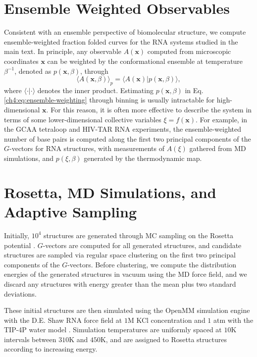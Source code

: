 \section{Ensemble Weighted Observables}
\label{ch4:app:ensemble-weighted-observables}

Consistent with an ensemble perspective of biomolecular structure, we compute ensemble-weighted fraction folded curves for the RNA systems studied in the main text. In principle, any observable $A(\mathbf{x})$ computed from microscopic coordinates $\mathbf{x}$ can be weighted by the conformational ensemble at temperature $\beta^{-1}$, denoted as $p(\mathbf{x},\beta)$, through
\begin{equation}
    \label{ch4:eq:ensemble-weighting}
    \langle A(\mathbf{x},\beta)\rangle_p = \langle A(\mathbf{x})|p(\mathbf{x},\beta) \rangle,
\end{equation}
where $\langle \cdot | \cdot \rangle$ denotes the inner product. Estimating $p(\mathbf{x},\beta)$ in Eq. \ref{ch4:eq:ensemble-weighting} through binning is usually intractable for high-dimensional $\mathbf{x}$. For this reason, it is often more effective to describe the system in terms of some lower-dimensional collective variables $\xi = f(\mathbf{x})$. For example, in the GCAA tetraloop and HIV-TAR RNA experiments, the ensemble-weighted number of base pairs is computed along the first two principal components of the $G$-vectors for RNA structures, with measurements of $A(\xi)$ gathered from MD simulations, and $p(\xi,\beta)$ generated by the thermodynamic map.

\section{Rosetta, MD Simulations, and Adaptive Sampling}
\label{ch4:app:rosetta-md-adaptive}

Initially, $10^4$ structures are generated through MC sampling on the Rosetta potential \cite{rosetta}. $G$-vectors are computed for all generated structures, and candidate structures are sampled via regular space clustering on the first two principal components of the $G$-vectors. Before clustering, we compute the distribution energies of the generated structures in vacuum using the MD force field, and we discard any structures with energy greater than the mean plus two standard deviations.

These initial structures are then simulated using the OpenMM simulation engine \cite{openmm} with the D.E. Shaw RNA force field \cite{DE-Shaw-RNA-ff} at $1$M KCl concentration and $1$ atm with the TIP-4P water model \cite{tip4p}. Simulation temperatures are uniformly spaced at $10$K intervals between $310$K and $450$K, and are assigned to Rosetta structures according to increasing energy.

